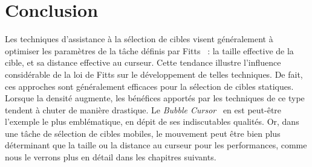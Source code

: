\section{Conclusion}
    Les techniques d'assistance à la sélection de cibles visent généralement à optimiser les paramètres de la tâche définis par Fitts~\cite{fitts1954information} : la taille effective de la cible, et sa distance effective au curseur. Cette tendance illustre l'influence considérable de la loi de Fitts sur le développement de telles techniques. De fait, ces approches sont généralement efficaces pour la sélection de cibles statiques. Lorsque la densité augmente, les bénéfices apportés par les techniques de ce type tendent à chuter de manière drastique. Le \emph{Bubble Cursor}~\cite{grossman2005bubble} en est peut-être l'exemple le plus emblématique, en dépit de ses indiscutables qualités. Or, dans une tâche de sélection de cibles mobiles, le mouvement peut être bien plus déterminant que la taille ou la distance au curseur pour les performances, comme nous le verrons plus en détail dans les chapitres suivants.
    
